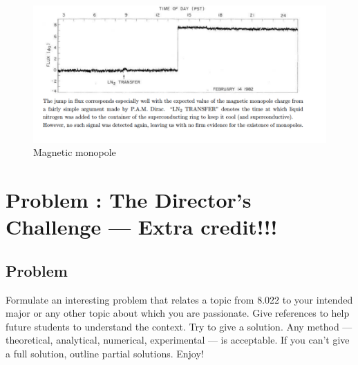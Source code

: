 \documentclass[solutions]{esg8022pset}
\begin{document}
     \begin{figure}[H]
    \centering
    \includegraphics[width = 15cm]{monopole_sol_d}
    \caption{Magnetic monopole}
\end{figure}

\section{Problem \thesection: The Director's Challenge --- Extra credit!!!}
\subsection{Problem}
  Formulate an interesting problem that relates a topic from 8.022 to your
  intended major or any other topic about which you are passionate.  Give references
  to help future students to understand the context.  Try to give a solution.
  Any method --- theoretical, analytical, numerical, experimental --- is acceptable.
  If you can't give a full solution, outline partial solutions. Enjoy!
\end{document}
